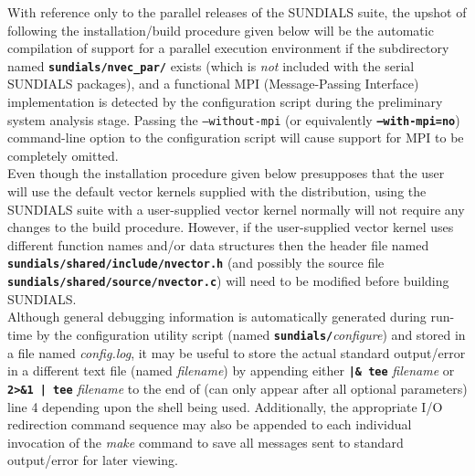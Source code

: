 \documentclass[10pt]{report}
\begin{document}
With reference only to the parallel releases of the \small SUNDIALS \normalsize suite, the upshot of following the installation/build procedure given below will be the automatic compilation of support for a parallel execution environment if the subdirectory named \texttt{\textbf{sundials/nvec\_\hspace{0.2ex}par/}} exists (which is \textit{not} included with the serial \small SUNDIALS \normalsize packages), and a functional \small MPI \normalsize (\small M\normalsize essage-\small P\normalsize assing \small I\normalsize nterface) implementation is detected by the configuration script during the preliminary system analysis stage.  Passing the \texttt{--without-mpi} (or equivalently \texttt{\textbf{--with-mpi=no}}) command-line option to the configuration script will cause support for \small MPI \normalsize to be completely omitted.
\\

Even though the installation procedure given below presupposes that the user will use the default vector kernels supplied with the distribution, using the \small SUNDIALS \normalsize suite with a user-supplied vector kernel normally will not require any changes to the build procedure.  However, if the user-supplied vector kernel uses different function names and/or data structures then the header file named \texttt{\textbf{sundials/shared/include/nvector.h}} (and possibly the source file \texttt{\textbf{sundials/shared/source/nvector.c}}) will need to be modified before building \small SUNDIALS\normalsize .
\\

Although general debugging information is automatically generated during run-time by the configuration utility script (named \texttt{\textbf{sundials/}}\textit{configure}) and stored in a file named \textit{config.log}, it may be useful to store the actual standard output/error in a different text file (named \textit{filename}) by appending either \texttt{\textbf{|\& tee}}\textit{ filename} or \texttt{\textbf{2>\&1 | tee}}\textit{ filename} to the end of (can only appear after all optional parameters) line \small 4 \normalsize depending upon the shell being used.  Additionally, the appropriate \small I\normalsize/\small O \normalsize redirection command sequence may also be appended to each individual invocation of the \textit{make} command to save all messages sent to standard output/error for later viewing.
\\
\end{document}
